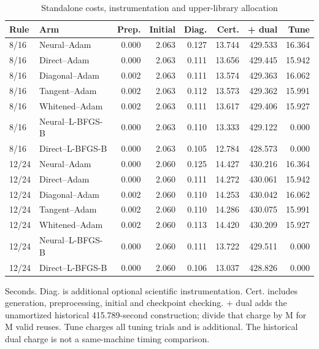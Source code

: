 \begin{table}[htbp]\centering\footnotesize\setlength{\tabcolsep}{4pt}
\caption{Standalone costs, instrumentation and upper-library allocation}\label{tab:r24cost}
\begin{tabular}{llrrrrrr}\toprule
Rule & Arm & Prep. & Initial & Diag. & Cert. & + dual & Tune\\\midrule
8/16 & Neural--Adam & 0.000 & 2.063 & 0.127 & 13.744 & 429.533 & 16.364\\
8/16 & Direct--Adam & 0.000 & 2.063 & 0.111 & 13.656 & 429.445 & 15.942\\
8/16 & Diagonal--Adam & 0.002 & 2.063 & 0.111 & 13.574 & 429.363 & 16.062\\
8/16 & Tangent--Adam & 0.002 & 2.063 & 0.112 & 13.573 & 429.362 & 15.991\\
8/16 & Whitened--Adam & 0.002 & 2.063 & 0.111 & 13.617 & 429.406 & 15.927\\
8/16 & Neural--L-BFGS-B & 0.000 & 2.063 & 0.110 & 13.333 & 429.122 & 0.000\\
8/16 & Direct--L-BFGS-B & 0.000 & 2.063 & 0.105 & 12.784 & 428.573 & 0.000\\
12/24 & Neural--Adam & 0.000 & 2.060 & 0.125 & 14.427 & 430.216 & 16.364\\
12/24 & Direct--Adam & 0.000 & 2.060 & 0.111 & 14.272 & 430.061 & 15.942\\
12/24 & Diagonal--Adam & 0.002 & 2.060 & 0.110 & 14.253 & 430.042 & 16.062\\
12/24 & Tangent--Adam & 0.002 & 2.060 & 0.110 & 14.286 & 430.075 & 15.991\\
12/24 & Whitened--Adam & 0.002 & 2.060 & 0.113 & 14.420 & 430.209 & 15.927\\
12/24 & Neural--L-BFGS-B & 0.000 & 2.060 & 0.111 & 13.722 & 429.511 & 0.000\\
12/24 & Direct--L-BFGS-B & 0.000 & 2.060 & 0.106 & 13.037 & 428.826 & 0.000\\
\bottomrule\end{tabular}
\par\smallskip\begin{minipage}{.97\textwidth}\footnotesize Seconds. Diag. is additional optional scientific instrumentation. Cert. includes generation, preprocessing, initial and checkpoint checking. + dual adds the unamortized historical 415.789-second construction; divide that charge by M for M valid reuses. Tune charges all tuning trials and is additional. The historical dual charge is not a same-machine timing comparison.\end{minipage}
\end{table}
